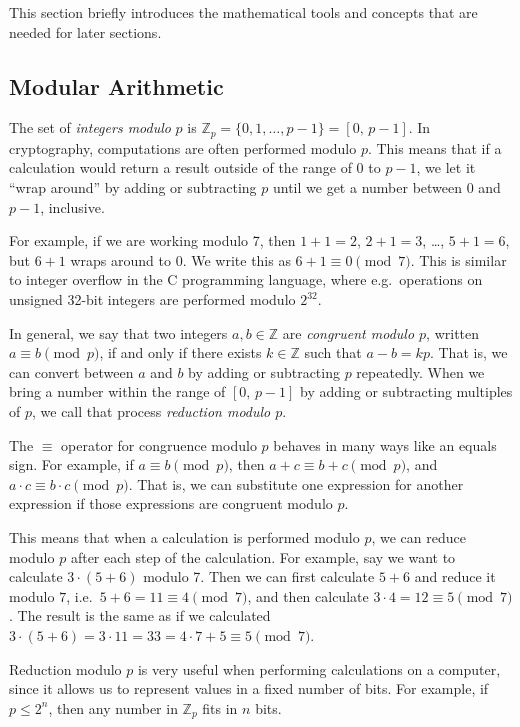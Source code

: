 \documentclass{article}
\begin{document}
This section briefly introduces the mathematical tools and concepts that are needed for later sections.

\subsection{Modular Arithmetic}\label{sec:modular-arithmetic}

The set of \emph{integers modulo} $p$ is $\mathbb{Z}_p = \{0, 1, \dots, p-1\} = [0,\, p-1]$.
In cryptography, computations are often performed modulo $p$.
This means that if a calculation would return a result outside of the range of 0 to $p-1$, we let it ``wrap around'' by adding or subtracting $p$ until we get a number between 0 and $p-1$, inclusive.

For example, if we are working modulo 7, then $1+1=2$, $2+1=3$, \dots, $5+1=6$, but $6+1$ wraps around to $0$.
We write this as $6+1 \equiv 0 \pmod{7}$.
This is similar to integer overflow in the C programming language, where e.g.\ operations on unsigned 32-bit integers are performed modulo $2^{32}$.

In general, we say that two integers $a, b \in \mathbb{Z}$ are \emph{congruent modulo $p$}, written $a \equiv b \pmod{p}$, if and only if there exists $k \in \mathbb{Z}$ such that $a - b = kp$.
That is, we can convert between $a$ and $b$ by adding or subtracting $p$ repeatedly.
When we bring a number within the range of $[0,\, p-1]$ by adding or subtracting multiples of $p$, we call that process \emph{reduction modulo $p$}.

The $\equiv$ operator for congruence modulo $p$ behaves in many ways like an equals sign.
For example, if $a \equiv b \pmod{p}$, then $a+c \equiv b+c \pmod{p}$, and $a \cdot c \equiv b \cdot c \pmod{p}$.
That is, we can substitute one expression for another expression if those expressions are congruent modulo $p$.

This means that when a calculation is performed modulo $p$, we can reduce modulo $p$ after each step of the calculation.
For example, say we want to calculate $3 \cdot (5 + 6)$ modulo 7.
Then we can first calculate $5+6$ and reduce it modulo $7$, i.e.\ $5+6 = 11 \equiv 4 \pmod{7}$, and then calculate $3 \cdot 4 = 12 \equiv 5 \pmod{7}
$.
The result is the same as if we calculated $3 \cdot (5 + 6) = 3 \cdot 11 = 33 = 4 \cdot 7 + 5 \equiv 5 \pmod{7}$.

Reduction modulo $p$ is very useful when performing calculations on a computer, since it allows us to represent values in a fixed number of bits.
For example, if $p \le 2^n$, then any number in $\mathbb{Z}_p$ fits in $n$ bits.
\end{document}
